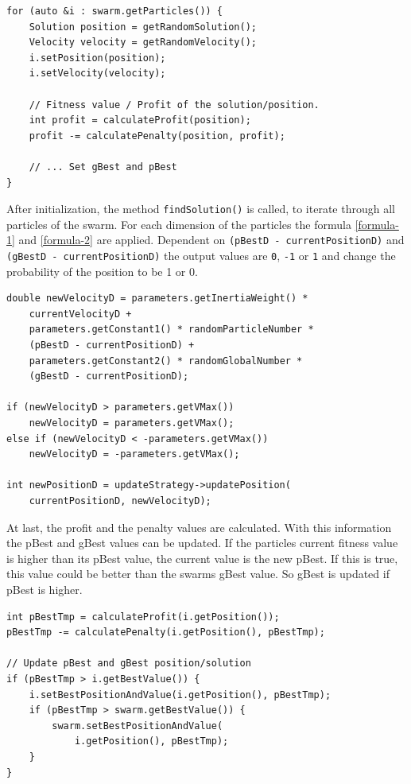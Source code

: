 \documentclass{article}
\begin{document}
\begin{lstlisting}[caption="Solver.cpp"]
for (auto &i : swarm.getParticles()) {
	Solution position = getRandomSolution();
   	Velocity velocity = getRandomVelocity();
	i.setPosition(position);
	i.setVelocity(velocity);
	
	// Fitness value / Profit of the solution/position.
	int profit = calculateProfit(position);
	profit -= calculatePenalty(position, profit);
	
	// ... Set gBest and pBest
}
\end{lstlisting}

After initialization, the method \lstinline$findSolution()$ is called, to iterate through all particles of the swarm. For each dimension of the particles the formula \ref{formula-1} and \ref{formula-2} are applied. Dependent on \lstinline{(pBestD - currentPositionD)} and \lstinline{(gBestD - currentPositionD)} the output values are \lstinline$0$, \lstinline$-1$ or \lstinline$1$ and change the probability of the position to be 1 or 0.\\

\begin{lstlisting}[caption="Solver.cpp"]
double newVelocityD = parameters.getInertiaWeight() *
	currentVelocityD +
	parameters.getConstant1() * randomParticleNumber *
	(pBestD - currentPositionD) +
	parameters.getConstant2() * randomGlobalNumber *
	(gBestD - currentPositionD);

if (newVelocityD > parameters.getVMax())
    newVelocityD = parameters.getVMax();
else if (newVelocityD < -parameters.getVMax())
    newVelocityD = -parameters.getVMax();

int newPositionD = updateStrategy->updatePosition(
	currentPositionD, newVelocityD);
\end{lstlisting}

At last, the profit and the penalty values are calculated. With this information the pBest and gBest values can be updated. If the particles current fitness value is higher than its pBest value, the current value is the new pBest. If this is true, this value could be better than the swarms gBest value. So gBest is updated if pBest is higher.\\

\begin{lstlisting}[caption="Solver.cpp"]
int pBestTmp = calculateProfit(i.getPosition());
pBestTmp -= calculatePenalty(i.getPosition(), pBestTmp);

// Update pBest and gBest position/solution
if (pBestTmp > i.getBestValue()) {
	i.setBestPositionAndValue(i.getPosition(), pBestTmp);
	if (pBestTmp > swarm.getBestValue()) {
	    swarm.setBestPositionAndValue(
	    	i.getPosition(), pBestTmp);
	}
}
\end{lstlisting}
\end{document}
